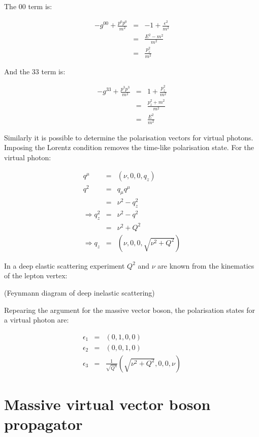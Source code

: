 The $00$ term is:

\begin{eqnarray*}
  -g^{00} + \frac{p^0p^0}{m^2} & = & -1 + \frac{\epsilon^2}{m^2} \\
  & = & \frac{E^2 - m^2}{m^2} \\
  & = & \frac{p_z^2}{m^2}
\end{eqnarray*}

And the $33$ term is:

\begin{eqnarray*}
  -g^{33} + \frac{p^3p^3}{m^2} & = & 1 + \frac{p_z^2}{m^2} \\
  & = & \frac{p_z^2 + m^2}{m^2} \\
  & = & \frac{E^2}{m^2}
\end{eqnarray*}

Similarly it is possible to determine the polarisation vectors for virtual photons.  Imposing the Lorentz condition removes the time-like polarisation state.  For the virtual photon:

\begin{eqnarray*}
  q^{\mu} & = & (\nu,0,0,q_z) \\
  q^2 & = & q_{\mu}q^{\mu} \\
  & = & \nu^2 - q_z^2 \\
  \Rightarrow q_z^2 & = & \nu^2 - q^2 \\
  & = & \nu^2 + Q^2 \\
  \Rightarrow q_z & = & (\nu,0,0,\sqrt{\nu^2 + Q^2})
\end{eqnarray*}

In a deep elastic scattering experiment $Q^2$ and $\nu$ are known from the kinematics of the lepton vertex:

(Feynmann diagram of deep inelastic scattering)

Repearing the argument for the massive vector boson, the polarisation states for a virtual photon are:

\begin{eqnarray*}
  \epsilon_1 & = & (0,1,0,0) \\
  \epsilon_2 & = & (0,0,1,0) \\
  \epsilon_3 & = & \frac{1}{\sqrt{Q^4}}(\sqrt{\nu^2 + Q^2},0,0,\nu)
\end{eqnarray*}

\section{Massive virtual vector boson propagator}

